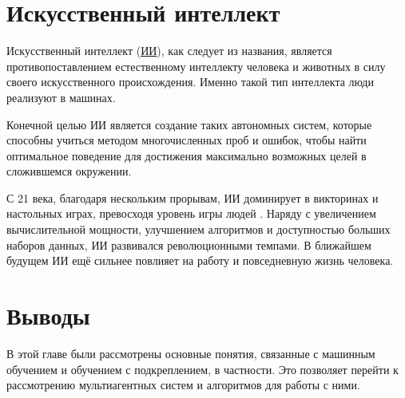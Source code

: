 \section{Искусственный интеллект} \label{ch1:ai}

Искусственный интеллект \cite{Crevier93} (\hyperref[acr:ai]{ИИ}), как следует из названия, является противопоставлением естественному интеллекту человека и животных в силу своего искусственного происхождения. Именно такой тип интеллекта люди реализуют в машинах.

Конечной целью ИИ является создание таких автономных систем, которые способны учиться методом многочисленных проб и ошибок, чтобы найти оптимальное поведение для достижения максимально возможных целей в сложившемся окружении. \cite{RussellAndNorvig-AI-modern-approach}

С 21 века, благодаря нескольким прорывам, ИИ доминирует в викторинах и настольных играх, превосходя уровень игры людей \cite{Watson} \cite{AlphaGo}. Наряду с увеличением вычислительной мощности, улучшением алгоритмов и доступностью больших наборов данных, ИИ развивался революционными темпами. В ближайшем будущем ИИ ещё сильнее повлияет на работу и повседневную жизнь человека.





\section{Выводы} \label{ch1:conclusion}

В этой главе были рассмотрены основные понятия, связанные с машинным обучением и обучением с подкреплением, в частности. Это позволяет перейти к рассмотрению мультиагентных систем и алгоритмов для работы с ними.

%
\newpage %
